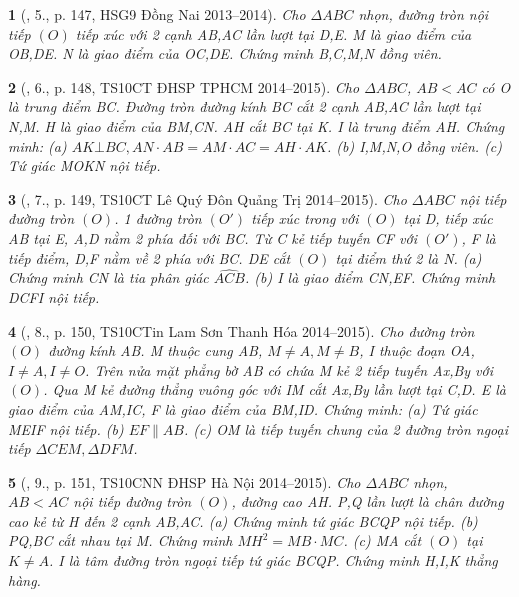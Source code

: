 \documentclass{article}
\newtheorem{baitoan}{}
\begin{document}
\begin{baitoan}[\cite{Thu_Chung_Viet_Minh_circ}, 5., p. 147, HSG9 Đồng Nai 2013--2014]
	Cho $\Delta ABC$ nhọn, đường tròn nội tiếp $(O)$ tiếp xúc với 2 cạnh AB,AC lần lượt tại D,E. M là giao điểm của OB,DE. N là giao điểm của OC,DE. Chứng minh B,C,M,N đồng viên.
\end{baitoan}

\begin{baitoan}[\cite{Thu_Chung_Viet_Minh_circ}, 6., p. 148, TS10CT ĐHSP TPHCM 2014--2015]
	Cho $\Delta ABC$, $AB < AC$ có O là trung điểm BC. Đường tròn đường kính BC cắt 2 cạnh AB,AC lần lượt tại N,M. H là giao điểm của BM,CN. AH cắt BC tại K. I là trung điểm AH. Chứng minh: (a) $AK\bot BC,AN\cdot AB = AM\cdot AC = AH\cdot AK$. (b) I,M,N,O đồng viên. (c) Tứ giác MOKN nội tiếp.
\end{baitoan}

\begin{baitoan}[\cite{Thu_Chung_Viet_Minh_circ}, 7., p. 149, TS10CT Lê Quý Đôn Quảng Trị 2014--2015]
	Cho $\Delta ABC$ nội tiếp đường tròn $(O)$. 1 đường tròn $(O')$ tiếp xúc trong với $(O)$ tại D, tiếp xúc AB tại E, A,D nằm 2 phía đối với BC. Từ C kẻ tiếp tuyến CF với $(O')$, F là tiếp điểm, D,F nằm về 2 phía với BC. DE cắt $(O)$ tại điểm thứ 2 là N. (a) Chứng minh CN là tia phân giác $\widehat{ACB}$. (b) I là giao điểm CN,EF. Chứng minh DCFI nội tiếp.
\end{baitoan}

\begin{baitoan}[\cite{Thu_Chung_Viet_Minh_circ}, 8., p. 150, TS10CTin Lam Sơn Thanh Hóa 2014--2015]
	Cho đường tròn $(O)$ đường kính AB. M thuộc cung AB, $M\ne A,M\ne B$, I thuộc đoạn OA, $I\ne A,I\ne O$. Trên nửa mặt phẳng bờ AB có chứa M kẻ 2 tiếp tuyến Ax,By với $(O)$. Qua M kẻ đường thẳng vuông góc với IM cắt Ax,By lần lượt tại C,D. E là giao điểm của AM,IC, F là giao điểm của BM,ID. Chứng minh: (a) Tứ giác MEIF nội tiếp. (b) $EF\parallel AB$. (c) OM là tiếp tuyến chung của 2 đường tròn ngoại tiếp $\Delta CEM,\Delta DFM$.
\end{baitoan}

\begin{baitoan}[\cite{Thu_Chung_Viet_Minh_circ}, 9., p. 151, TS10CNN ĐHSP Hà Nội 2014--2015]
	Cho $\Delta ABC$ nhọn, $AB < AC$ nội tiếp đường tròn $(O)$, đường cao AH. P,Q lần lượt là chân đường cao kẻ từ H đến 2 cạnh AB,AC. (a) Chứng minh tứ giác BCQP nội tiếp. (b) PQ,BC cắt nhau tại M. Chứng minh $MH^2 = MB\cdot MC$. (c) MA cắt $(O)$ tại $K\ne A$. I là tâm đường tròn ngoại tiếp tứ giác BCQP. Chứng minh H,I,K thẳng hàng.
\end{baitoan}
\end{document}
